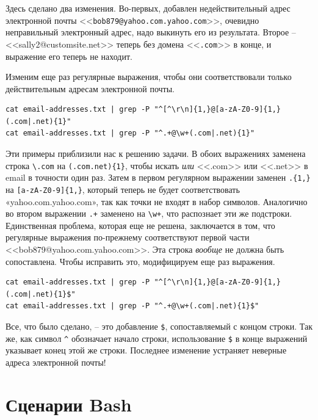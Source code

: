 \documentclass[a4paper,12pt,final,openany]{extbook}
\begin{document}
Здесь сделано два изменения. Во-первых, добавлен недействительный адрес
электронной почты
<<\texttt{bob879@yahoo.com.yahoo.com}>>,
очевидно неправильный электронный адрес, надо выкинуть его из
результата. Второе --
<<sally2@customsite.net>>
теперь без домена <<\texttt{.com}>> в конце, и выражение его теперь не находит.

Изменим еще раз регулярные выражения, чтобы они соответствовали только
действительным адресам электронной почты.
\begin{verbatim}
cat email-addresses.txt | grep -P "^[^\r\n]{1,}@[a-zA-Z0-9]{1,}(.com|.net){1}"
cat email-addresses.txt | grep -P "^.+@\w+(.com|.net){1}"
\end{verbatim}

Эти примеры приблизили нас к решению задачи. В обоих выражениях заменена
строка \texttt{\textbackslash{}.com} на
\texttt{(.com\textbar{}.net)\{1\}}, чтобы искать \emph{или} <<.com>> или
<<.net>> в email в точности один раз. Затем в первом регулярном выражении заменен \texttt{.\{1,\}} на \texttt{{[}a-zA-Z0-9{]}\{1,\}},
который теперь не будет соответствовать «yahoo.com.yahoo.com», так как
точки не входят в набор символов. Аналогично во втором выражении
\texttt{.+} заменено на \texttt{\textbackslash{}w+}, что распознает эти
же подстроки. Единственная проблема, которая еще не решена, заключается в
том, что регулярные выражения по-прежнему соответствуют первой части
<<bob879@yahoo.com.yahoo.com>>.
Эта строка \emph{вообще} не должна быть сопоставлена. Чтобы исправить
это, модифицируем еще раз выражения.
\begin{verbatim}
cat email-addresses.txt | grep -P "^[^\r\n]{1,}@[a-zA-Z0-9]{1,}(.com|.net){1}$"
cat email-addresses.txt | grep -P "^.+@\w+(.com|.net){1}$"
\end{verbatim}

Все, что было сделано, -- это добавление \texttt{\$}, сопоставляемый с
концом строки. Так же, как символ \texttt{\^{}} обозначает начало
строки, использование \texttt{\$} в конце выражений указывает конец этой
же строки. Последнее изменение устраняет неверные адреса электронной
почты!

\hypertarget{Bash-Scripting}{%
\section{\texorpdfstring{\protect\hyperlink{Bash-Scripting}{}Сценарии
Bash}{Сценарии Bash}}\label{Bash-Scripting}}
\end{document}
